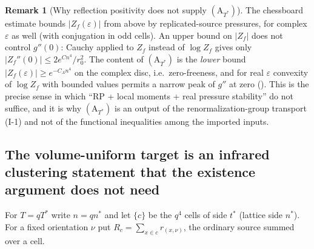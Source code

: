 \documentclass[11pt]{article}
\theoremstyle{definition}
\newtheorem{remark}[theorem]{Remark}
\begin{document}
\begin{remark}[Why reflection positivity does not supply $(\mathrm A_{T^*})$]
The chessboard estimate bounds $|Z_f(\varepsilon)|$ from above by replicated-source pressures, for complex
$\varepsilon$ as well (with conjugation in odd cells). An upper bound on $|Z_f|$ does not control $g''(0)$: Cauchy applied
to $Z_f$ instead of $\log Z_f$ gives only $|Z_f''(0)|\le2e^{C n^4}/r_0^2$. The content of $(\mathrm A_{T^*})$ is the
\emph{lower} bound $|Z_f(\varepsilon)|\ge e^{-C_An^4}$ on the complex disc, i.e.\ zero-freeness, and for real
$\varepsilon$ convexity of $\log Z_f$ with bounded values permits a narrow peak of $g''$ at zero (\cite[Part~VI, remark after (T17)]{csj}). This is the precise sense in which
``RP + local moments + real pressure stability'' do not suffice, and it is why $(\mathrm A_{T^*})$ is an
output of the renormalization-group transport (I-1) and not of the functional inequalities among the imported inputs.
\end{remark}

\subsection{The volume-uniform target is an infrared clustering statement that the existence argument does not need}

For $T=qT^*$ write $n=qn^*$ and let $\{c\}$ be the $q^4$ cells of side $t^*$ (lattice side $n^*$). For a fixed
orientation $\nu$ put $R_c=\sum_{x\in c}r_{(x,\nu)}$, the ordinary source summed over a cell.
\end{document}
